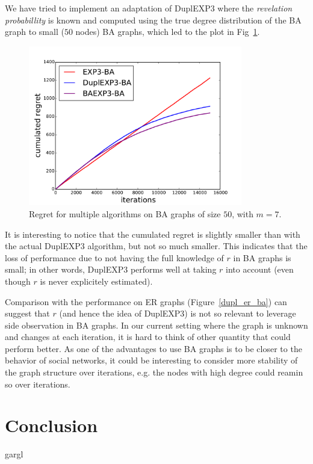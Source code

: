 \documentclass[10pt,a4paper]{scrartcl}
\begin{document}
We have tried to implement an adaptation of DuplEXP3 where the \emph{revelation probabillity} is known and computed using the true degree distribution of the BA graph to small ($50$ nodes) BA graphs, which led to the plot in Fig~\ref{dupl_ba_finite_ba}.

\begin{figure}[h!]
\centering
\includegraphics[height=7cm]{figures/50Kestim_BAdupl_big.pdf} %
 \caption{Regret for multiple algorithms on BA graphs of size $50$, with $m=7$.}
 \label{dupl_ba_finite_ba}
\end{figure}

 It is interesting to notice that the cumulated regret is slightly smaller than with the actual DuplEXP3 algorithm, but not so much smaller. This indicates that the loss of performance due to not having the full knowledge of $r$ in BA graphs is small; in other words, DuplEXP3 performs well at taking $r$ into account (even though $r$ is never explicitely estimated). 

Comparison with the performance on ER graphs (Figure~\ref{dupl_er_ba}) can suggest that $r$ (and hence the idea of  DuplEXP3) is not so relevant to leverage side observation in BA graphs. In our current setting where the graph is unknown and changes at each iteration, it is hard to think of other quantity that could perform better. As one of the advantages to use BA graphs is to be closer to the behavior of social networks, it could be interesting to consider more stability of the graph structure over iterations, e.g. the nodes with high degree could reamin so over iterations. 




\section{Conclusion}
gargl



\end{document}
